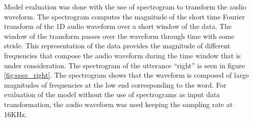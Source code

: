\documentclass{article}
\begin{document}
Model evaluation was done with the use of spectrogram to
transform the audio waveform. The spectrogram computes the magnitude
of the short time Fourier transform of the 1D audio waveform over a
short window of the data. The window of the transform passes over the
waveform through time with some stride. This representation of the
data provides the magnitude of different frequencies that compose the
audio waveform during the time window that is under consideration. The
spectrogram of the utterance ``right'' is seen in figure
\ref{fig:spec_right}. The spectrogram shows that the waveform is
composed of large magnitudes of frequencies at the low end
corresponding to the word. For evaluation of the model without the use
of spectrograms as input data transformation, the audio waveform was
used keeping the sampling rate at 16KHz.
\end{document}
